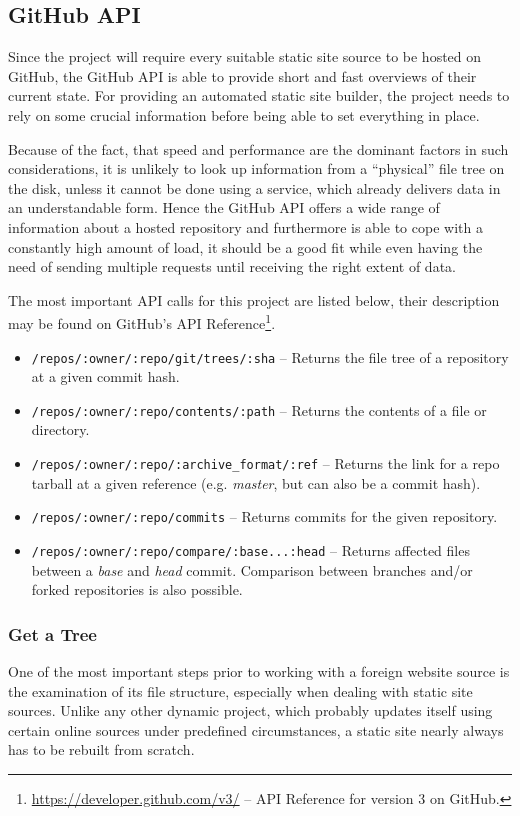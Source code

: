 \subsection{GitHub API}
\label{sec:foundation-github}

Since the project will require every suitable static site source to be hosted on GitHub, the GitHub API is able to provide short and fast overviews of their current state. For providing an automated static site builder, the project needs to rely on some crucial information before being able to set everything in place.

Because of the fact, that speed and performance are the dominant factors in such considerations, it is unlikely to look up information from a ``physical'' file tree on the disk, unless it cannot be done using a service, which already delivers data in an understandable form. Hence the GitHub API offers a wide range of information about a hosted repository and furthermore is able to cope with a constantly high amount of load, it should be a good fit while even having the need of sending multiple requests until receiving the right extent of data.

The most important API calls for this project are listed below, their description may be found on GitHub's API Reference\footnote{\url{https://developer.github.com/v3/} -- API Reference for version 3 on GitHub.}.

\begin{itemize}
  \item \texttt{/repos/:owner/:repo/git/trees/:sha} -- Returns the file tree of a repository at a given commit hash.
  \item \texttt{/repos/:owner/:repo/contents/:path} -- Returns the contents of a file or directory. %
  \item \texttt{/repos/:owner/:repo/:archive\_format/:ref} -- Returns the link for a repo tarball at a given reference (e.g. \emph{master}, but can also be a commit hash).
  \item \texttt{/repos/:owner/:repo/commits} -- Returns commits for the given repository.
  \item \texttt{/repos/:owner/:repo/compare/:base...:head} -- Returns affected files between a \emph{base} and \emph{head} commit. Comparison between branches and/or forked repositories is also possible.
\end{itemize}

\subsubsection{Get a Tree}
One of the most important steps prior to working with a foreign website source is the examination of its file structure, especially when dealing with static site sources. Unlike any other dynamic project, which probably updates itself using certain online sources under predefined circumstances, a static site nearly always has to be rebuilt from scratch.

